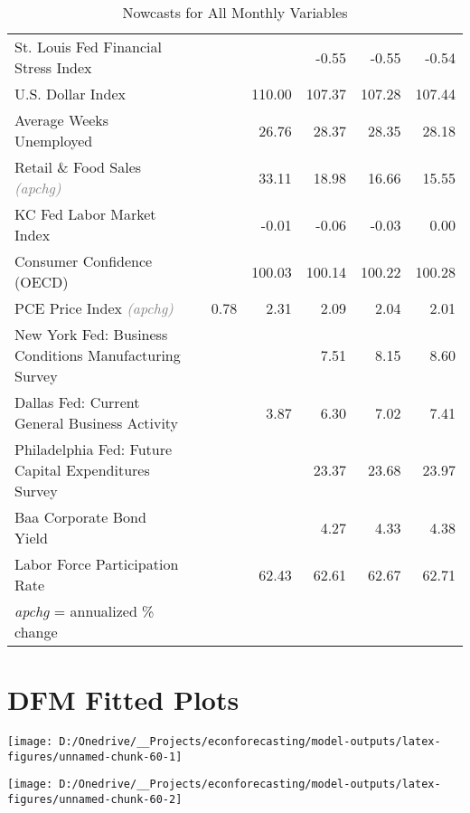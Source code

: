 \documentclass[11pt, letterpaper]{article}\usepackage[]{graphicx}\usepackage[]{color}
\begin{document}
\begin{table}[H]
\begin{tabular}{lrrrrrr}
  St. Louis Fed Financial Stress Index &  &  &  & -0.55 & -0.55 & -0.54 \\ 
  U.S. Dollar Index &  &  & 110.00 & 107.37 & 107.28 & 107.44 \\ 
  Average Weeks Unemployed &  &  & 26.76 & 28.37 & 28.35 & 28.18 \\ 
  Retail \& Food Sales \textit{\footnotesize\textcolor{gray}{(apchg)}} &  &  & 33.11 & 18.98 & 16.66 & 15.55 \\ 
  KC Fed Labor Market Index &  &  & -0.01 & -0.06 & -0.03 & 0.00 \\ 
  Consumer Confidence (OECD) &  &  & 100.03 & 100.14 & 100.22 & 100.28 \\ 
  PCE Price Index \textit{\footnotesize\textcolor{gray}{(apchg)}} &  & 0.78 & 2.31 & 2.09 & 2.04 & 2.01 \\ 
  New York Fed: Business Conditions Manufacturing Survey &  &  &  & 7.51 & 8.15 & 8.60 \\ 
  Dallas Fed: Current General Business Activity &  &  & 3.87 & 6.30 & 7.02 & 7.41 \\ 
  Philadelphia Fed: Future Capital Expenditures Survey &  &  &  & 23.37 & 23.68 & 23.97 \\ 
  Baa Corporate Bond Yield &  &  &  & 4.27 & 4.33 & 4.38 \\ 
  Labor Force Participation Rate &  &  & 62.43 & 62.61 & 62.67 & 62.71 \\ 
   \hline 
 \textit{apchg} = annualized \% change 
\end{tabular}
\endgroup
\caption{Nowcasts for All Monthly Variables} 
\end{table}



\appendix
\appendixpage
\addappheadtotoc

\section{DFM Fitted Plots}


{\centering \texttt{[image: D:/Onedrive/\_\_Projects/econforecasting/model-outputs/latex-figures/unnamed-chunk-60-1]} 

}




{\centering \texttt{[image: D:/Onedrive/\_\_Projects/econforecasting/model-outputs/latex-figures/unnamed-chunk-60-2]} 

}
\end{document}
